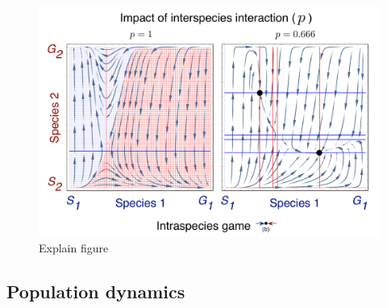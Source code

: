 \documentclass{pnastwo}
\begin{document}
\begin{article}
\begin{figure}[h]
\begin{center}
\includegraphics[width=2\columnwidth]{../Figures/mainexample.pdf}
\caption{
Explain figure
}
\end{center}
\end{figure}

\subsection{Population dynamics}




\end{article}
\end{document}
